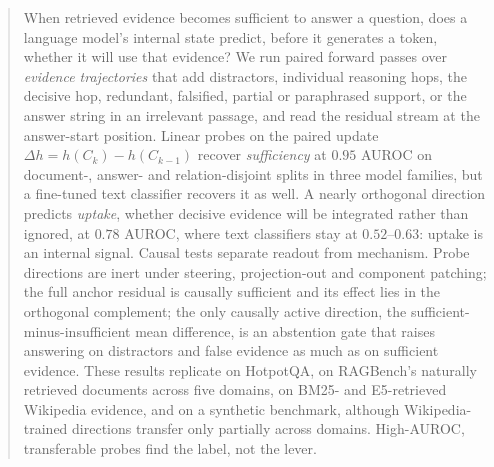 \begin{abstract}
When retrieved evidence becomes sufficient to answer a question, does a language model's internal state predict, before it generates a token, whether it will use that evidence? We run paired forward passes over \emph{evidence trajectories} that add distractors, individual reasoning hops, the decisive hop, redundant, falsified, partial or paraphrased support, or the answer string in an irrelevant passage, and read the residual stream at the answer-start position. Linear probes on the paired update $\Delta h = h(C_k)-h(C_{k-1})$ recover \emph{sufficiency} at $0.95$ AUROC on document-, answer- and relation-disjoint splits in three model families, but a fine-tuned text classifier recovers it as well. A nearly orthogonal direction predicts \emph{uptake}, whether decisive evidence will be integrated rather than ignored, at $0.78$ AUROC, where text classifiers stay at $0.52$--$0.63$: uptake is an internal signal. Causal tests separate readout from mechanism. Probe directions are inert under steering, projection-out and component patching; the full anchor residual is causally sufficient and its effect lies in the orthogonal complement; the only causally active direction, the sufficient-minus-insufficient mean difference, is an abstention gate that raises answering on distractors and false evidence as much as on sufficient evidence. These results replicate on HotpotQA, on RAGBench's naturally retrieved documents across five domains, on BM25- and E5-retrieved Wikipedia evidence, and on a synthetic benchmark, although Wikipedia-trained directions transfer only partially across domains. High-AUROC, transferable probes find the label, not the lever.
\end{abstract}
